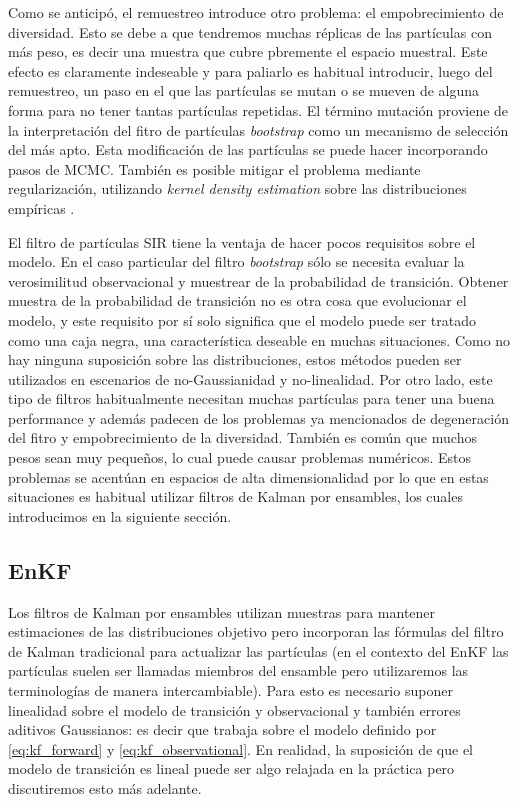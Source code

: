 Como se anticipó, el remuestreo introduce otro problema: el empobrecimiento de diversidad. Esto se debe a que tendremos muchas réplicas de las partículas con más peso, es decir una muestra que cubre pbremente el espacio muestral. Este efecto es claramente indeseable y para paliarlo es habitual introducir, luego del remuestreo, un paso en el que las partículas se mutan o se mueven de alguna forma para no tener tantas partículas repetidas. El término mutación proviene de la interpretación del fitro de partículas \textit{bootstrap} como un mecanismo de selección del más apto. Esta modificación de las partículas se puede hacer incorporando pasos de MCMC. También es posible mitigar el problema mediante regularización, utilizando \textit{kernel density estimation} sobre las distribuciones empíricas \citep{Sarkka2013, Arulampalam2002, Ruchi2019}.

El filtro de partículas SIR tiene la ventaja de hacer pocos requisitos sobre el modelo. En el caso particular del filtro \textit{bootstrap} sólo se necesita evaluar la verosimilitud observacional y muestrear de la probabilidad de transición. Obtener muestra de la probabilidad de transición no es otra cosa que evolucionar el modelo, y este requisito por sí solo significa que el modelo puede ser tratado como una caja negra, una característica deseable en muchas situaciones. Como no hay ninguna suposición sobre las distribuciones, estos métodos pueden ser utilizados en escenarios de no-Gaussianidad y no-linealidad. Por otro lado, este tipo de filtros habitualmente necesitan muchas partículas para tener una buena performance y además padecen de los problemas ya mencionados de degeneración del fitro y empobrecimiento de la diversidad. También es común que muchos pesos sean muy pequeños, lo cual puede causar problemas numéricos. Estos problemas se acentúan en espacios de alta dimensionalidad por lo que en estas situaciones es habitual utilizar filtros de Kalman por ensambles, los cuales introducimos en la siguiente sección.

\subsection{EnKF} \label{sec:enkf}

Los filtros de Kalman por ensambles utilizan muestras para mantener estimaciones de las distribuciones objetivo pero incorporan las fórmulas del filtro de Kalman tradicional para actualizar las partículas (en el contexto del EnKF las partículas suelen ser llamadas miembros del ensamble pero utilizaremos las terminologías de manera intercambiable). Para esto es necesario suponer linealidad sobre el modelo de transición y observacional y también errores aditivos Gaussianos: es decir que trabaja sobre el modelo definido por \ref{eq:kf_forward} y \ref{eq:kf_observational}. En realidad, la suposición de que el modelo de transición es lineal puede ser algo relajada en la práctica pero discutiremos esto más adelante.

